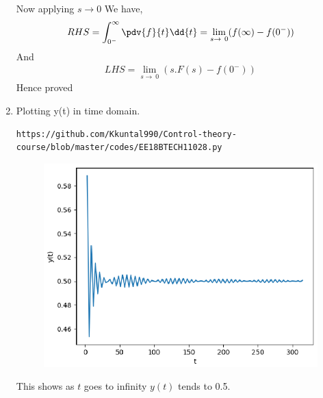\begin{enumerate}[label=\thesection.\arabic*.,ref=\thesection.\theenumi]
Now applying $ s \to 0$
We have,
\begin{align}
 RHS =\int_{0^-}^{\infty} \pdv{f}{t}\dd{t} = \lim_{s\to\ 0}(f(\infty) - f(0^{-})) 
\end{align}
And
\begin{align}
    LHS= \lim_{s\to\ 0}(s.F(s)-f(0^{-}))
\end{align}
Hence proved
\newline
\newline

\item Plotting y(t) in time domain.
\begin{lstlisting}
https://github.com/Kkuntal990/Control-theory-course/blob/master/codes/EE18BTECH11028.py
\end{lstlisting}
\begin{figure}[!h]
  \includegraphics[width=\columnwidth]{./figs/EE18BTECH11028.eps}
\end{figure}

This shows as $t$ goes to infinity $y(t)$ tends to 0.5.
\end{enumerate}

